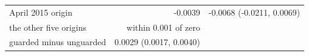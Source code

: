 \begin{tabular}{lrr}
April 2015 origin & -0.0039 & -0.0068 (-0.0211, 0.0069) \\
the other five origins & within 0.001 of zero &  \\
guarded minus unguarded & 0.0029 (0.0017, 0.0040) &  \\
\bottomrule
\end{tabular}
